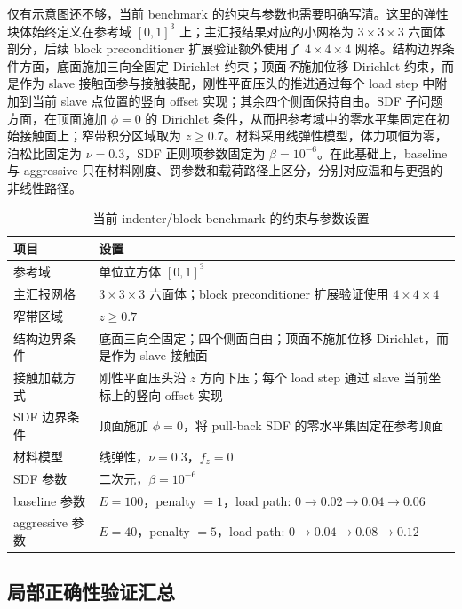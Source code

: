 \documentclass[12pt,a4paper]{ctexart}
\numberwithin{equation}{section}
\begin{document}
仅有示意图还不够，当前 benchmark 的约束与参数也需要明确写清。这里的弹性块体始终定义在参考域 $[0,1]^3$ 上；主汇报结果对应的小网格为 $3\times 3\times 3$ 六面体剖分，后续 block preconditioner 扩展验证额外使用了 $4\times 4\times 4$ 网格。结构边界条件方面，底面施加三向全固定 Dirichlet 约束；顶面\emph{不}施加位移 Dirichlet 约束，而是作为 slave 接触面参与接触装配，刚性平面压头的推进通过每个 load step 中附加到当前 slave 点位置的竖向 offset 实现；其余四个侧面保持自由。SDF 子问题方面，在顶面施加 $\phi=0$ 的 Dirichlet 条件，从而把参考域中的零水平集固定在初始接触面上；窄带积分区域取为 $z\ge 0.7$。材料采用线弹性模型，体力项恒为零，泊松比固定为 $\nu=0.3$，SDF 正则项参数固定为 $\beta=10^{-6}$。在此基础上，baseline 与 aggressive 只在材料刚度、罚参数和载荷路径上区分，分别对应温和与更强的非线性路径。

\begin{table}[H]
\centering
\caption{当前 indenter/block benchmark 的约束与参数设置}
\label{tab:benchmark-setup}
\small
\begin{tabular}{p{4.4cm} p{9.8cm}}
\toprule
项目 & 设置 \\
\midrule
参考域 & 单位立方体 $[0,1]^3$ \\
主汇报网格 & $3\times 3\times 3$ 六面体；block preconditioner 扩展验证使用 $4\times 4\times 4$ \\
窄带区域 & $z\ge 0.7$ \\
结构边界条件 & 底面三向全固定；四个侧面自由；顶面不施加位移 Dirichlet，而是作为 slave 接触面 \\
接触加载方式 & 刚性平面压头沿 $z$ 方向下压；每个 load step 通过 slave 当前坐标上的竖向 offset 实现 \\
SDF 边界条件 & 顶面施加 $\phi=0$，将 pull-back SDF 的零水平集固定在参考顶面 \\
材料模型 & 线弹性，$\nu=0.3$，$f_z=0$ \\
SDF 参数 & 二次元，$\beta=10^{-6}$ \\
baseline 参数 & $E=100$，penalty $=1$，load path: $0\rightarrow 0.02\rightarrow 0.04\rightarrow 0.06$ \\
aggressive 参数 & $E=40$，penalty $=5$，load path: $0\rightarrow 0.04\rightarrow 0.08\rightarrow 0.12$ \\
\bottomrule
\end{tabular}
\end{table}

\subsection{局部正确性验证汇总}
\end{document}
